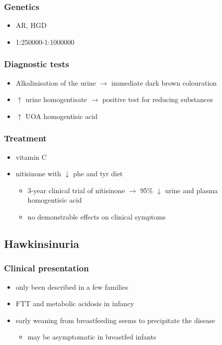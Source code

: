 \documentclass{scrartcl}
\begin{document}
\subsubsection{Genetics}
\label{sec:org00d7db0}
\begin{itemize}
\item AR, HGD
\item 1:250000-1:1000000
\end{itemize}
\subsubsection{Diagnostic tests}
\label{sec:org83b35d2}
\begin{itemize}
\item Alkalinisation of the urine \(\to\) immediate dark brown colouration
\item \(\uparrow\) urine homogentisate \(\to\) positive test for reducing substances
\item \(\uparrow\) UOA homogentisic acid
\end{itemize}
\subsubsection{Treatment}
\label{sec:orgc8e4fb4}
\begin{itemize}
\item vitamin C
\item nitisinone with \(\downarrow\) phe and tyr diet
\begin{itemize}
\item 3-year clinical trial of nitisinone \(\to\) 95\% \(\downarrow\) urine and plasma homogentisic acid
\item no demonstrable effects on clinical symptoms
\end{itemize}
\end{itemize}

\subsection{Hawkinsinuria}
\label{sec:orge8f8345}
\subsubsection{Clinical presentation}
\label{sec:orgc7dfd62}
\begin{itemize}
\item only been described in a few families
\item FTT and metabolic acidosis in infancy
\item early weaning from breastfeeding seems to precipitate the disease
\begin{itemize}
\item may be asymptomatic in breastfed infants
\end{itemize}
\end{itemize}
\end{document}
